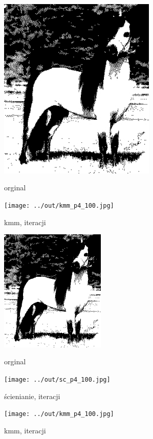 \documentclass[a4paper,12pt]{article}
\begin{document}
\begin{figure}[h!]
\begin{minipage}[t]{7.5cm}
\begin{center}
\includegraphics[width=7.5cm]{../in/p4.jpg}
\caption{orginal}
\end{center}
\end{minipage}
\hfill
\begin{minipage}[t]{7.5cm}
\begin{center}
\texttt{[image: ../out/kmm\_p4\_100.jpg]}
\caption{kmm, \protect iteracji}
\end{center}
\end{minipage}
\end{figure}

\newpage
\begin{figure}[h!]
\begin{minipage}[t]{5cm}
\begin{center}
\includegraphics[width=5cm]{../in/p4.jpg}
\caption{orginal}
\end{center}
\end{minipage}
\hfill
\begin{minipage}[t]{5cm}
\begin{center}
\texttt{[image: ../out/sc\_p4\_100.jpg]}
\caption{ścienianie, \protect iteracji}
\end{center}
\end{minipage}
\hfill
\begin{minipage}[t]{5cm}
\begin{center}
\texttt{[image: ../out/kmm\_p4\_100.jpg]}
\caption{kmm, \protect iteracji}
\end{center}
\end{minipage}
\end{figure}
\end{document}
